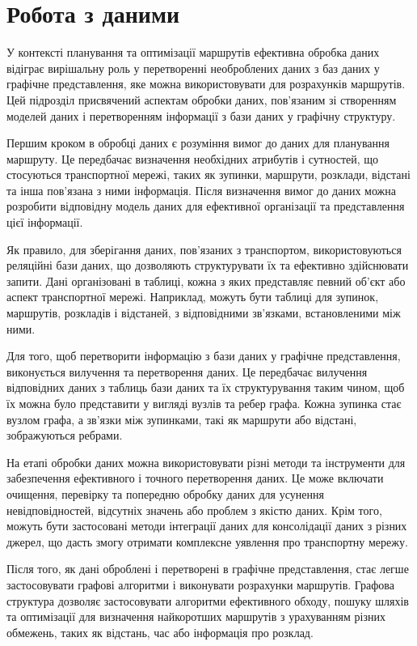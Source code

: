 \section{Робота з даними}
\label{sec:data}

У контексті планування та оптимізації маршрутів ефективна обробка даних відіграє вирішальну роль у перетворенні необроблених даних з баз даних у графічне представлення, яке можна використовувати для розрахунків маршрутів. Цей підрозділ присвячений аспектам обробки даних, пов'язаним зі створенням моделей даних і перетворенням інформації з бази даних у графічну структуру.

Першим кроком в обробці даних є розуміння вимог до даних для планування маршруту. Це передбачає визначення необхідних атрибутів і сутностей, що стосуються транспортної мережі, таких як зупинки, маршрути, розклади, відстані та інша пов'язана з ними інформація. Після визначення вимог до даних можна розробити відповідну модель даних для ефективної організації та представлення цієї інформації.

Як правило, для зберігання даних, пов'язаних з транспортом, використовуються реляційні бази даних, що дозволяють структурувати їх та ефективно здійснювати запити. Дані організовані в таблиці, кожна з яких представляє певний об'єкт або аспект транспортної мережі. Наприклад, можуть бути таблиці для зупинок, маршрутів, розкладів і відстаней, з відповідними зв'язками, встановленими між ними.

Для того, щоб перетворити інформацію з бази даних у графічне представлення, виконується вилучення та перетворення даних. Це передбачає вилучення відповідних даних з таблиць бази даних та їх структурування таким чином, щоб їх можна було представити у вигляді вузлів та ребер графа. Кожна зупинка стає вузлом графа, а зв'язки між зупинками, такі як маршрути або відстані, зображуються ребрами.

На етапі обробки даних можна використовувати різні методи та інструменти для забезпечення ефективного і точного перетворення даних. Це може включати очищення, перевірку та попередню обробку даних для усунення невідповідностей, відсутніх значень або проблем з якістю даних. Крім того, можуть бути застосовані методи інтеграції даних для консолідації даних з різних джерел, що дасть змогу отримати комплексне уявлення про транспортну мережу.

Після того, як дані оброблені і перетворені в графічне представлення, стає легше застосовувати графові алгоритми і виконувати розрахунки маршрутів. Графова структура дозволяє застосовувати алгоритми ефективного обходу, пошуку шляхів та оптимізації для визначення найкоротших маршрутів з урахуванням різних обмежень, таких як відстань, час або інформація про розклад.

